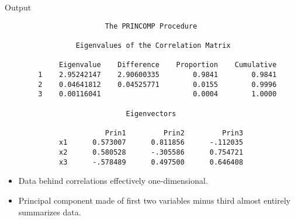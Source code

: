 \documentclass[pdf]{prosper}
\begin{document}
\begin{slide}{Output}

{\scriptsize
\begin{verbatim}
                        The PRINCOMP Procedure

                 Eigenvalues of the Correlation Matrix
 
             Eigenvalue    Difference    Proportion    Cumulative
        1    2.95242147    2.90600335        0.9841        0.9841
        2    0.04641812    0.04525771        0.0155        0.9996
        3    0.00116041                      0.0004        1.0000

                             Eigenvectors
 
                        Prin1         Prin2         Prin3
             x1      0.573007      0.811856      -.112035
             x2      0.580528      -.305586      0.754721
             x3      -.578489      0.497500      0.646408

\end{verbatim}
}

\begin{itemize}
\item Data behind correlations effectively one-dimensional.
\item Principal component made of first two variables minus third almost entirely summarizes data.
\end{itemize}
  
\end{slide}
\end{document}
